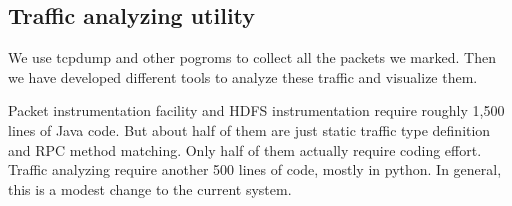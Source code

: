 \subsection{Traffic analyzing utility}
    We use tcpdump and other pogroms to collect all the packets we marked. Then we have developed different tools to analyze these traffic and visualize them. 

Packet instrumentation facility and HDFS instrumentation require roughly 1,500 lines of Java code. But about half of them are just static traffic type definition and RPC method matching. Only half of them actually require coding effort. Traffic analyzing require another 500 lines of code, mostly in python. In general, this is a modest change to the current system.

